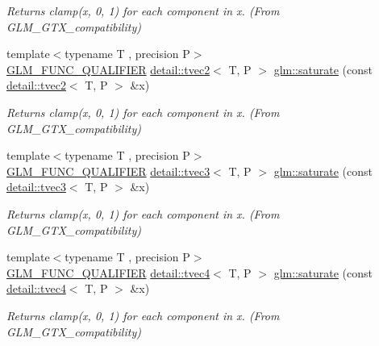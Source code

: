 \begin{DoxyCompactItemize}
\begin{DoxyCompactList}\small\item\em Returns clamp(x, 0, 1) for each component in x. (From G\+L\+M\+\_\+\+G\+T\+X\+\_\+compatibility) \end{DoxyCompactList}\item 
{\footnotesize template$<$typename T , precision P$>$ }\\\hyperlink{setup_8hpp_a33fdea6f91c5f834105f7415e2a64407}{G\+L\+M\+\_\+\+F\+U\+N\+C\+\_\+\+Q\+U\+A\+L\+I\+F\+I\+ER} \hyperlink{structglm_1_1detail_1_1tvec2}{detail\+::tvec2}$<$ T, P $>$ \hyperlink{group__gtx__compatibility_gab7c26da683d068e34feaa3ae90a528c1}{glm\+::saturate} (const \hyperlink{structglm_1_1detail_1_1tvec2}{detail\+::tvec2}$<$ T, P $>$ \&x)
\begin{DoxyCompactList}\small\item\em Returns clamp(x, 0, 1) for each component in x. (From G\+L\+M\+\_\+\+G\+T\+X\+\_\+compatibility) \end{DoxyCompactList}\item 
{\footnotesize template$<$typename T , precision P$>$ }\\\hyperlink{setup_8hpp_a33fdea6f91c5f834105f7415e2a64407}{G\+L\+M\+\_\+\+F\+U\+N\+C\+\_\+\+Q\+U\+A\+L\+I\+F\+I\+ER} \hyperlink{structglm_1_1detail_1_1tvec3}{detail\+::tvec3}$<$ T, P $>$ \hyperlink{group__gtx__compatibility_ga367b1adb1d748e156db972cc92b42483}{glm\+::saturate} (const \hyperlink{structglm_1_1detail_1_1tvec3}{detail\+::tvec3}$<$ T, P $>$ \&x)
\begin{DoxyCompactList}\small\item\em Returns clamp(x, 0, 1) for each component in x. (From G\+L\+M\+\_\+\+G\+T\+X\+\_\+compatibility) \end{DoxyCompactList}\item 
{\footnotesize template$<$typename T , precision P$>$ }\\\hyperlink{setup_8hpp_a33fdea6f91c5f834105f7415e2a64407}{G\+L\+M\+\_\+\+F\+U\+N\+C\+\_\+\+Q\+U\+A\+L\+I\+F\+I\+ER} \hyperlink{structglm_1_1detail_1_1tvec4}{detail\+::tvec4}$<$ T, P $>$ \hyperlink{group__gtx__compatibility_gaad58ab5081f38e91ba5a99a25ba6270c}{glm\+::saturate} (const \hyperlink{structglm_1_1detail_1_1tvec4}{detail\+::tvec4}$<$ T, P $>$ \&x)
\begin{DoxyCompactList}\small\item\em Returns clamp(x, 0, 1) for each component in x. (From G\+L\+M\+\_\+\+G\+T\+X\+\_\+compatibility) \end{DoxyCompactList}\item 

\end{DoxyCompactItemize}

